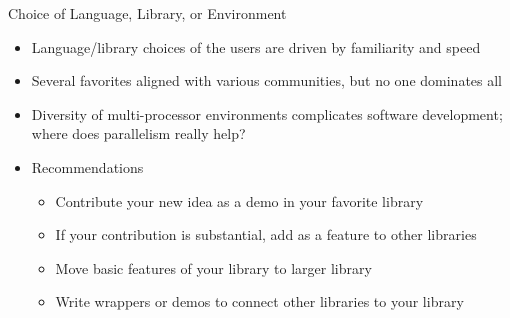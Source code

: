 \documentclass[11pt,compress,xcolor={usenames,dvipsnames},aspectratio=169]{beamer}
\begin{document}
\begin{frame}{Choice of Language, Library, or Environment}
	\begin{itemize}
    \item Language/library choices of the users are driven by familiarity and speed

    \item Several favorites aligned with various communities, but no one dominates all

    \item Diversity of multi-processor environments complicates software development; where does parallelism really help?

    \item<2-> Recommendations
    \begin{itemize}
    \item Contribute your new idea as a demo in your favorite library
    \item If your contribution is substantial, add as a feature to other libraries
    \item Move basic features of your library to larger library
    \item Write wrappers or demos to connect other libraries to your library
    
    \end{itemize}
 \end{itemize}
\end{frame}
\end{document}
